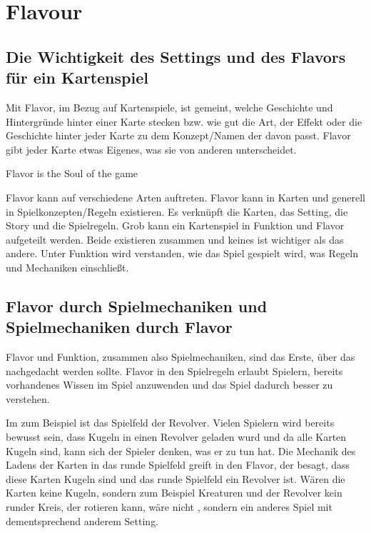 
\section{Flavour}\label{sec:flavour}

\renewcommand{\kapitelautor}{Autor: Philip Jankovic}

\subsection{Die Wichtigkeit des Settings und des Flavors für ein Kartenspiel}\label{subsec:wichtigkeit-des-flavours}

%
Mit Flavor, im Bezug auf Kartenspiele, ist gemeint, welche Geschichte und Hintergründe hinter einer Karte stecken bzw.
wie gut die Art, der Effekt oder die Geschichte hinter jeder Karte zu dem Konzept/Namen der davon passt.
Flavor gibt jeder Karte etwas Eigenes, was sie von anderen unterscheidet.

\begin{coolQuote}
Flavor is the Soul of the game
\end{coolQuote}

Flavor kann auf verschiedene Arten auftreten. Flavor kann in Karten und generell in Spielkonzepten/Regeln existieren.
Es verknüpft die Karten, das Setting, die Story und die Spielregeln. Grob kann ein Kartenspiel in Funktion und Flavor aufgeteilt werden.
Beide existieren zusammen und keines ist wichtiger als das andere.
Unter Funktion wird verstanden, wie das Spiel gespielt wird, was Regeln und Mechaniken einschließt.


\subsection{Flavor durch Spielmechaniken und Spielmechaniken durch Flavor}

Flavor und Funktion, zusammen also Spielmechaniken, sind das Erste, über das nachgedacht werden sollte.
Flavor in den Spielregeln erlaubt Spielern, bereits vorhandenes Wissen im Spiel anzuwenden und das Spiel dadurch besser zu verstehen. 


Im \FF zum Beispiel ist das Spielfeld der Revolver. Vielen Spielern wird bereits bewusst sein, dass Kugeln in einen
Revolver geladen wurd und da alle Karten Kugeln sind, kann sich der Spieler denken, was er zu tun hat. Die Mechanik des Ladens
der Karten in das runde Spielfeld greift in den Flavor, der besagt, dass diese Karten Kugeln sind und das runde Spielfeld
ein Revolver ist. Wären die Karten keine Kugeln, sondern zum Beispiel Kreaturen und der Revolver kein runder Kreis,
der rotieren kann, wäre \FF nicht \FF, sondern ein anderes Spiel mit dementsprechend anderem Setting.


